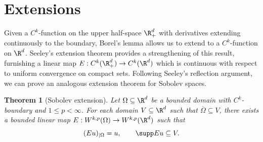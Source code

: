 \documentclass[reqno]{amsart}
\newtheorem{theorem}{Theorem}
\theoremstyle{definition}
\theoremstyle{remark}
\begin{document}
\section{Extensions}	

Given a $C^k$-function on the upper half-space $\R^d_+$ with derivatives extending continuously to the boundary, Borel's lemma allows us to extend to a $C^k$-function on $\R^d$. Seeley's extension theorem \cite{Seeley64} provides a strengthening of this result, furnishing a linear map $E: C^k (\R^d_+) \to C^k (\R^d)$ which is continuous with respect to uniform convergence on compact sets. Following Seeley's reflection argument, we can prove an analogous extension theorem for Sobolev spaces. 

\begin{theorem}[Sobolev extension]
	Let $\Omega \subseteq \R^d$ be a bounded domain with $C^k$-boundary and $1 \leq p < \infty$. For each domain $V \subseteq \R^d$ such that $\overline \Omega \subseteq V$, there exists a bounded linear map $E: W^{k, p} (\Omega) \to W^{k, p} (\R^d)$ such that 
		\[ (Eu)_{|\Omega} = u, \qquad \supp Eu \subseteq V. \]	
\end{theorem}
\end{document}
